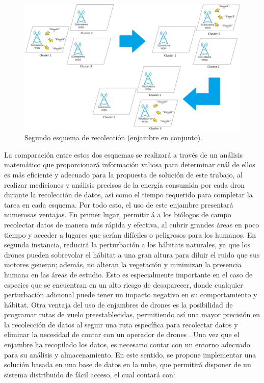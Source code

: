 \begin{figure}[h]
    \centering
    \includegraphics[width=0.7\linewidth]{imagenes/img6_segundo_esquema_recoleccion.jpg}
    \caption{Segundo esquema de recolección (enjambre en conjunto).}
    \label{figura6}
\end{figure}
\newpage
\noindent La comparación entre estos dos esquemas se realizará a través de un análisis matemático que proporcionará información valiosa para determinar cuál de ellos es más eficiente y adecuado para la propuesta de solución de este trabajo, al realizar mediciones y análisis precisos de la energía consumida por cada dron durante la recolección de datos, así como el tiempo requerido para completar la tarea en cada esquema.
Por todo esto, el uso de este enjambre presentará numerosas ventajas. En primer lugar, permitir á a los biólogos de campo recolectar datos de manera más rápida y efectiva, al cubrir grandes áreas en poco tiempo y acceder a lugares que serían difíciles o peligrosos para los humanos. En segunda instancia, reducirá la perturbación a los hábitats naturales, ya que los drones pueden sobrevolar el hábitat a una gran altura para diluir el ruido que sus motores generan; además, no alteran la vegetación y minimizan la presencia humana en las áreas de estudio. Esto es especialmente importante en el caso de especies que se encuentran en un alto riesgo de desaparecer, donde cualquier perturbación adicional puede tener un impacto negativo en su comportamiento y hábitat. Otra ventaja del uso de enjambres de drones es la posibilidad de programar rutas de vuelo preestablecidas, permitiendo así una mayor precisión en la recolección de datos al seguir una ruta específica para recolectar datos y eliminar la necesidad de contar con un operador de drones \cite{28}.
Una vez que el enjambre ha recopilado los datos, es necesario contar con un entorno adecuado para su análisis y almacenamiento. En este sentido, se propone implementar una solución basada en una base de datos en la nube, que permitirá disponer de un sistema distribuido de fácil acceso, el cual contará con:


